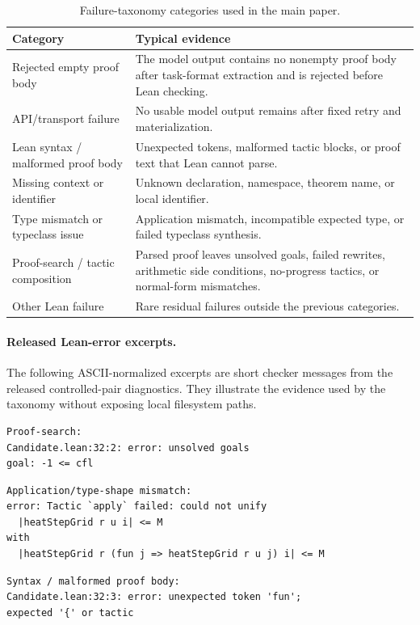 \begin{table}[htbp]
\centering
\caption{Failure-taxonomy categories used in the main paper.}
\label{tab:supp-taxonomy-rules}
\small
\begin{tabularx}{\linewidth}{lX}
\toprule
Category & Typical evidence\\
\midrule
Rejected empty proof body & The model output contains no nonempty proof body
after task-format extraction and is rejected before Lean checking.\\
API/transport failure & No usable model output remains after fixed retry and
materialization.\\
Lean syntax / malformed proof body & Unexpected tokens, malformed tactic
blocks, or proof text that Lean cannot parse.\\
Missing context or identifier & Unknown declaration, namespace, theorem name,
or local identifier.\\
Type mismatch or typeclass issue & Application mismatch, incompatible expected
type, or failed typeclass synthesis.\\
Proof-search / tactic composition & Parsed proof leaves unsolved goals, failed
rewrites, arithmetic side conditions, no-progress tactics, or normal-form
mismatches.\\
Other Lean failure & Rare residual failures outside the previous categories.\\
\bottomrule
\end{tabularx}
\end{table}

\paragraph{Released Lean-error excerpts.}
The following ASCII-normalized excerpts are short checker messages from the
released controlled-pair diagnostics. They illustrate the evidence used by
the taxonomy without exposing local filesystem paths.

\begin{verbatim}
Proof-search:
Candidate.lean:32:2: error: unsolved goals
goal: -1 <= cfl
\end{verbatim}

\begin{verbatim}
Application/type-shape mismatch:
error: Tactic `apply` failed: could not unify
  |heatStepGrid r u i| <= M
with
  |heatStepGrid r (fun j => heatStepGrid r u j) i| <= M
\end{verbatim}

\begin{verbatim}
Syntax / malformed proof body:
Candidate.lean:32:3: error: unexpected token 'fun';
expected '{' or tactic
\end{verbatim}


